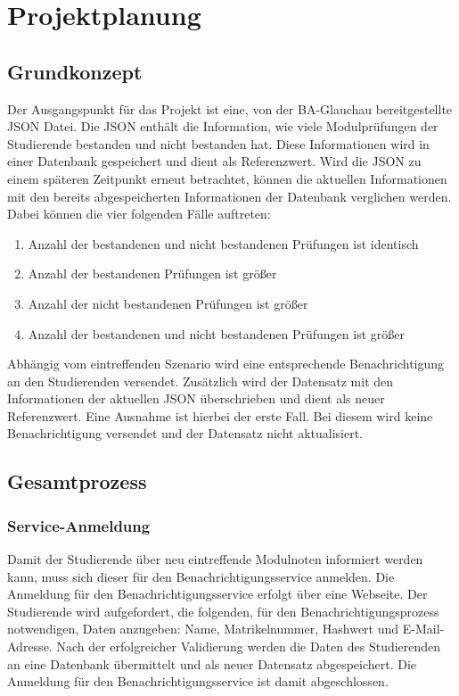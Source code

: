 \chapter{Projektplanung}
\label{Projektplanung}

\section{Grundkonzept}
\label{Grundkonzept}

Der Ausgangspunkt für das Projekt ist eine, von der BA-Glauchau bereitgestellte \ac{JSON} Datei.
Die \ac{JSON} enthält die Information, wie viele Modulprüfungen der Studierende bestanden und nicht bestanden hat.
Diese Informationen wird in einer Datenbank gespeichert und dient als Referenzwert.
Wird die \ac{JSON} zu einem späteren Zeitpunkt erneut betrachtet, können die aktuellen Informationen mit den bereits abgespeicherten Informationen der Datenbank verglichen werden.
Dabei können die vier folgenden Fälle auftreten:
\begin{enumerate}
    \item Anzahl der bestandenen und nicht bestandenen Prüfungen ist identisch
    \item Anzahl der bestandenen Prüfungen ist größer
    \item Anzahl der nicht bestandenen Prüfungen ist größer
    \item Anzahl der bestandenen und nicht bestandenen Prüfungen ist größer
\end{enumerate}

Abhängig vom eintreffenden Szenario wird eine entsprechende Benachrichtigung an den Studierenden versendet.
Zusätzlich wird der Datensatz mit den Informationen der aktuellen \ac{JSON} überschrieben und dient als neuer Referenzwert.
Eine Ausnahme ist hierbei der erste Fall.
Bei diesem wird keine Benachrichtigung versendet und der Datensatz nicht aktualisiert.



\section{Gesamtprozess}
\subsection{Service-Anmeldung}
Damit der Studierende über neu eintreffende Modulnoten informiert werden kann, muss sich dieser für den Benachrichtigungsservice anmelden.
Die Anmeldung für den Benachrichtigungsservice erfolgt über eine Webseite.
Der Studierende wird aufgefordert, die folgenden, für den Benachrichtigungsprozess notwendigen, Daten anzugeben: Name, Matrikelnummer, Hashwert und E-Mail-Adresse.
Nach der erfolgreicher Validierung werden die Daten des Studierenden an eine Datenbank übermittelt und als neuer Datensatz abgespeichert.
Die Anmeldung für den Benachrichtigungsservice ist damit abgeschlossen.

